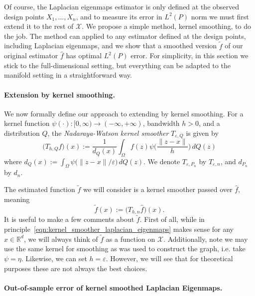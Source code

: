 \documentclass{article}
\newcommand{\Reals}{\mathbb{R}}
\newcommand{\1}{\mathbf{1}}
\newcommand{\Rd}{\Reals^d}
\newcommand{\Xset}{\mathcal{X}}
\newcommand{\mc}[1]{\mathcal{#1}}
\newcommand{\wt}[1]{\widetilde{#1}}
\newcommand{\wh}[1]{\widehat{#1}}
\theoremstyle{alden}
\theoremstyle{aldenthm}
\theoremstyle{definition}
\theoremstyle{remark}
\begin{document}
Of course, the Laplacian eigenmaps estimator is only defined at the observed design points $X_1,\ldots,X_n$, and to measure its error in $L^2(P)$ norm we must first extend it to the rest of $\Xset$. We propose a simple method, kernel smoothing, to do the job. The method can applied to any estimator defined at the design points, including Laplacian eigenmaps, and we show that a smoothed version $\wt{f}$ of our original estimator $\wh{f}$ has optimal $L^2(P)$ error. For simplicity, in this section we stick to the full-dimensional setting, but everything can be adapted to the manifold setting in a straightforward way.

\paragraph{Extension by kernel smoothing.}
We now formally define our approach to extending by kernel smoothing. For a kernel function $\psi(\cdot): [0,\infty) \to (-\infty,+\infty)$, bandwidth $h > 0$, and a distribution $Q$, the \emph{Nadaraya-Watson kernel smoother} $T_{\varepsilon,Q}$ is given by
\begin{equation*}
\bigl(T_{h,Q}f)(x) := \frac{1}{d_Q(x)} \int_{\Omega} f(z)\psi\biggl(\frac{\|z - x\|}{h}\biggr) \,dQ(z)
\end{equation*}
where $d_Q(x) := \int_{\Omega} \psi\bigl(\|z - x\|/\varepsilon\bigr) \,dQ(z)$. We denote $T_{\varepsilon,P_n}$ by $T_{\varepsilon,n}$, and $d_{P_n}$ by $d_n$. 

The estimated function $\wt{f}$ we will consider is a kernel smoother passed over $\wh{f}$, meaning
\begin{equation}
\label{eqn:kernel_smoother_laplacian_eigenmaps}
\wt{f}(x) := \bigl(T_{h,n}\wh{f}\bigr)(x).
\end{equation}
It is useful to make a few comments about $\wt{f}$. First of all, while in principle~\eqref{eqn:kernel_smoother_laplacian_eigenmaps} makes sense for any $x \in \Rd$, we will always think of $\wt{f}$ as a function on $\mc{X}$. Additionally, note we may use the same kernel for smoothing as was used to construct the graph, i.e. take $\psi = \eta$. Likewise, we can set $h = \varepsilon$. However, we will see that for theoretical purposes these are not always the best choices. 

\paragraph{Out-of-sample error of kernel smoothed Laplacian Eigenmaps.}
\end{document}
